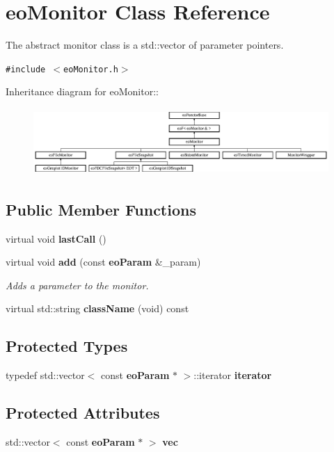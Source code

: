 \section{eo\-Monitor Class Reference}
\label{classeo_monitor}
The abstract monitor class is a std::vector of parameter pointers.  


{\tt \#include $<$eo\-Monitor.h$>$}

Inheritance diagram for eo\-Monitor::\begin{figure}[H]
\begin{center}
\leavevmode
\includegraphics[height=2.5641cm]{classeo_monitor}
\end{center}
\end{figure}
\subsection*{Public Member Functions}
\begin{CompactItemize}
\item 
virtual void {\bf last\-Call} ()\label{classeo_monitor_a0}

\item 
virtual void {\bf add} (const {\bf eo\-Param} \&\_\-param)
\begin{CompactList}\small\item\em Adds a parameter to the monitor. \item\end{CompactList}\item 
virtual std::string {\bf class\-Name} (void) const \label{classeo_monitor_a2}

\end{CompactItemize}
\subsection*{Protected Types}
\begin{CompactItemize}
\item 
typedef std::vector$<$ const {\bf eo\-Param} $\ast$ $>$::iterator {\bf iterator}\label{classeo_monitor_x0}

\end{CompactItemize}
\subsection*{Protected Attributes}
\begin{CompactItemize}
\item 
std::vector$<$ const {\bf eo\-Param} $\ast$ $>$ {\bf vec}\label{classeo_monitor_p0}

\end{CompactItemize}


